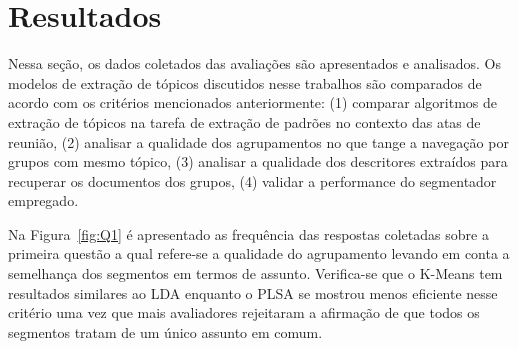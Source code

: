 
\section{Resultados}

Nessa seção, os dados coletados das avaliações são apresentados e analisados. Os modelos de extração de tópicos discutidos nesse trabalhos são comparados de acordo com os critérios mencionados anteriormente: 
(1) comparar algoritmos de extração de tópicos na tarefa de extração de padrões no contexto das atas de reunião, 
(2) analisar a qualidade dos agrupamentos no que tange a navegação por grupos com mesmo tópico, 
(3) analisar a qualidade dos descritores extraídos para recuperar os documentos dos grupos,
(4) validar a performance do segmentador empregado.


Na Figura~\ref{fig:Q1} é apresentado as frequência das respostas coletadas sobre a primeira questão a qual refere-se a qualidade do agrupamento levando em conta a semelhança dos segmentos em termos de assunto. Verifica-se que o K-Means tem resultados similares ao LDA enquanto o PLSA se mostrou menos eficiente nesse critério uma vez que mais avaliadores rejeitaram a afirmação de que todos os segmentos tratam de um único assunto em comum. 

